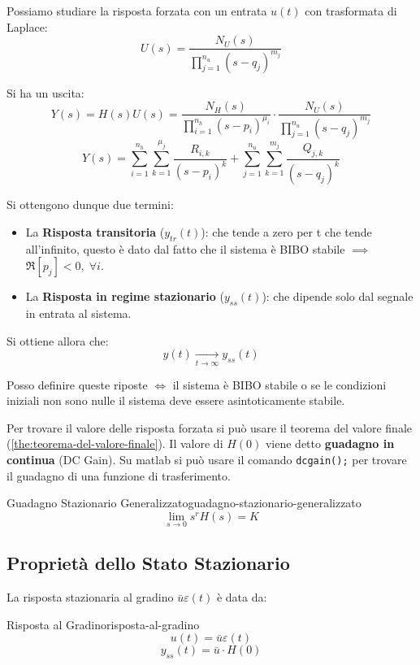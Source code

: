 \documentclass[12pt]{article}
\begin{document}
Possiamo studiare la risposta forzata con un entrata $u(t)$ con trasformata di Laplace:
\[ U(s) = \frac{N_U(s)}{\prod_{j=1}^{n_u} (s-q_j)^{m_j} }  \]

Si ha un uscita:
\[ Y(s) = H(s)U(s) = \frac{N_H(s)}{\prod_{i=1}^{n_h} (s-p_i)^{\mu_i} } \cdot \frac{N_U(s)}{\prod_{j=1}^{n_u} (s-q_j)^{m_j} }   \]
\[ Y(s) = \sum_{i=1}^{n_h} \sum_{k=1}^{\mu_j} \frac{R _{i,k}}{(s-p_i)^{k}} + \sum_{j=1}^{n_u} \sum_{k=1}^{m_j} \frac{Q _{j,k}}{(s-q_j)^{k}}  \]

Si ottengono dunque due termini:
\begin{itemize}
    \item La \textbf{Risposta transitoria} ($y _{tr}(t)$): che tende a zero per t che tende all'infinito, questo \`e dato dal fatto che il sistema \`e BIBO stabile $ \implies$ $\Re[p_j] < 0, \;\forall i$.
    \item La \textbf{Risposta in regime stazionario} ($y _{ss}(t)$): che dipende solo dal segnale in entrata al sistema.
\end{itemize}

Si ottiene allora che:
\[ y(t) \underset{t \to \infty}{\longrightarrow} y _{ss}(t) \]

Posso definire queste riposte $ \iff$ il sistema \`e BIBO stabile o se le condizioni iniziali non sono nulle il sistema deve essere asintoticamente stabile.




Per trovare il valore delle risposta forzata si pu\`o usare il teorema del valore finale (\ref{the:teorema-del-valore-finale}). Il valore di $H(0)$ viene detto \textbf{guadagno in continua} (DC Gain). Su matlab si pu\`o usare il comando \texttt{dcgain();} per trovare il guadagno di una funzione di trasferimento.

\begin{definition}{Guadagno Stazionario Generalizzato}{guadagno-stazionario-generalizzato}
    \[ \lim_{s \to 0} s^{r}H(s) = K \]
\end{definition}

\subsection{Propriet\`a dello Stato Stazionario}
La risposta stazionaria al gradino $\bar{u}\varepsilon(t)$ \`e data da:
\begin{theorem}{Risposta al Gradino}{risposta-al-gradino}
    \[ u(t) = \bar{u}\varepsilon(t) \]
    \[ y _{ss}(t) = \bar{u}\cdot H(0) \]
\end{theorem}
\end{document}

